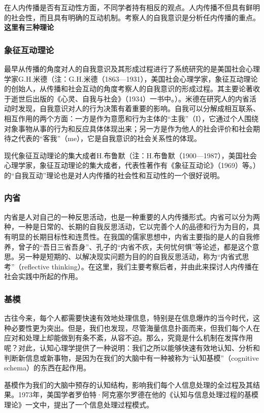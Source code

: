 \documentclass[UTF8,12pt]{ctexart}
\numberwithin{equation}{section} %
\numberwithin{figure}{section}
\numberwithin{table}{section}
\begin{document}
	在人内传播是否有互动性方面，不同学者持有相反的观点。人内传播不但具有鲜明的社会性，而且具有明确的互动机制。考察人的自我意识是分析任内传播的重点。\textbf{这里有三种理论}
	
	\subsubsection{象征互动理论}
	最早从传播的角度对人的自我意识及其形成过程进行了系统研究的是美国社会心理学家G.H.米德（注：G.H.米德（1863—1931），美国社会心理学家，象征互动理论的创始人，从传播和社会互动的角度考察人的自我意识的形成过程。其主要论著收于逝世后出版的《心灵、自我与社会》（1934）一书中。）。米德在研究人的内省活动时发现，自我意识对人的行为决策有着重要的影响。自我可以分解成相互联系、相互作用的两个方面：一方是作为意愿和行为主体的“主我”（I），它通过个人围绕对象事物从事的行为和反应具体体现出来；另一方是作为他人的社会评价和社会期待之代表的“客我”（me），它是自我意识的社会关系性的体现。
	
	现代象征互动理论的集大成者H.布鲁默（注：H.布鲁默（1900—1987），美国社会心理学家，象征互动理论的集大成者，代表性著作有《象征互动论》（1969）等。）的“自我互动”理论也是对人内传播的社会性和互动性的一个很好说明。
	
	\subsubsection{内省}
	内省是人对自己的一种反思活动，也是一种重要的人内传播形式。内省可以分为两种，一种是日常的、长期的自我反思活动，它以完善个人的品德和行为为目的，具有明显的长期目标性和连贯性。在我国的儒家思想中，内省主要指的是人的自我修养，曾子的“吾日三省吾身”、孔子的“内省不疚，夫何忧何惧”等论述，都是这个意思。另一种是短期的、以解决现实问题为目的的自我反思活动，称为“内省式思考”（reflective thinking）。在这里，我们主要考察后者，并由此来探讨人内传播在社会实践中所起的作用。
	
	\subsubsection{基模}
	古往今来，每个人都需要快速有效地处理信息，特别是在信息爆炸的当今时代，这种必要性更为突出。但是，我们也发现，尽管海量信息扑面而来，但我们每个人在应对和处理上却能做到有条不紊，从容不迫。那么，究竟是什么机制在发挥作用呢？对此，认知心理学提供了一种说明：我们之所以能够快速有效地认知、分析和判断新信息或新事物，是因为在我们的大脑中有一种被称为“认知基模”（cognitive schema）的东西在起作用。
	
	基模作为我们的大脑中预存的认知结构，影响我们每个人信息处理的全过程及其结果。1973年，美国学者罗伯特·阿克塞尔罗德在他的《认知与信息处理过程的基模理论》一文中，提出了一个信息处理过程模式。
	
\end{document}
